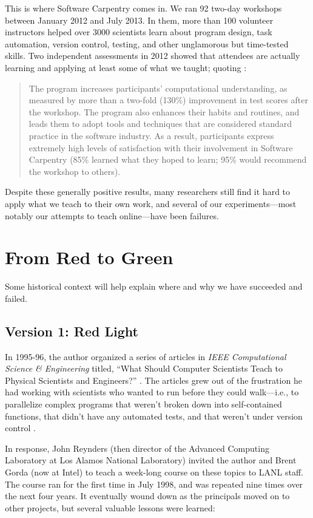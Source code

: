 \documentclass[10pt,a4paper,twocolumn]{article}
\begin{document}
This is where Software Carpentry comes in. We ran 92 two-day workshops
between January 2012 and July 2013. In them, more than 100 volunteer
instructors helped over 3000 scientists learn about program design, task
automation, version control, testing, and other unglamorous but
time-tested skills. Two independent assessments in 2012 showed that
attendees are actually learning and applying at least some of what we
taught; quoting \cite{aranda2012}:

\begin{quote}
The program increases participants' computational understanding, as
measured by more than a two-fold (130\%) improvement in test scores
after the workshop. The program also enhances their habits and routines,
and leads them to adopt tools and techniques that are considered
standard practice in the software industry. As a result, participants
express extremely high levels of satisfaction with their involvement in
Software Carpentry (85\% learned what they hoped to learn; 95\% would
recommend the workshop to others).
\end{quote}

Despite these generally positive results, many researchers still find it
hard to apply what we teach to their own work, and several of our
experiments---most notably our attempts to teach online---have been
failures.

\section*{From Red to Green}

Some historical context will help explain where and why we have
succeeded and failed.

\subsection*{Version 1: Red Light}

In 1995-96, the author organized a series of articles in \emph{IEEE
Computational Science \& Engineering} titled, ``What Should Computer
Scientists Teach to Physical Scientists and Engineers?'' \cite{wilson1996}.
The articles grew out of the frustration he had working with scientists
who wanted to run before they could walk---i.e., to parallelize complex
programs that weren't broken down into self-contained functions, that
didn't have any automated tests, and that weren't under version control
\cite{wilson2006a}.

In response, John Reynders (then director of the Advanced Computing
Laboratory at Los Alamos National Laboratory) invited the author and
Brent Gorda (now at Intel) to teach a week-long course on these topics
to LANL staff. The course ran for the first time in July 1998, and was
repeated nine times over the next four years. It eventually wound down
as the principals moved on to other projects, but several valuable
lessons were learned:
\end{document}
